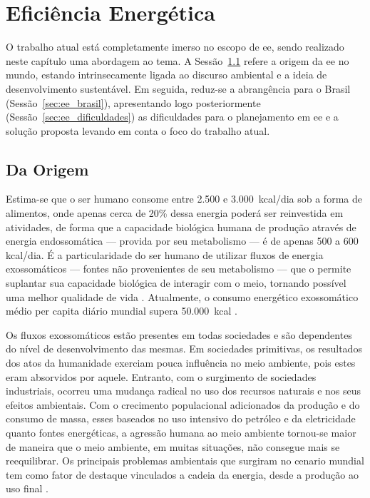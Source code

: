 \chapter{Eficiência Energética}
\label{chap:ee}
\glsresetall

O trabalho atual está completamente imerso no escopo de \gls{ee},
sendo realizado neste capítulo uma abordagem ao tema. 
A Sessão~\ref{sec:ee_origem} refere a origem da \gls{ee} no mundo, estando
intrinsecamente ligada ao discurso ambiental e a ideia de desenvolvimento
sustentável. Em seguida, reduz-se a abrangência para o Brasil
(Sessão~\ref{sec:ee_brasil}), apresentando logo posteriormente
(Sessão~\ref{sec:ee_dificuldades}) as dificuldades para o planejamento em \gls{ee} 
e a solução proposta levando em conta o foco do trabalho atual.

\section{Da Origem}
\label{sec:ee_origem}

Estima-se que o ser humano consome entre 2.500 e 3.000~\acs{kcal}/dia sob a 
forma de alimentos, onde apenas cerca de 20\% dessa energia poderá ser 
reinvestida em atividades, de forma que a capacidade biológica humana de produção
através de energia endossomática --- provida por seu metabolismo --- é de 
apenas 500 a 600 \acs{kcal}/dia. É a particularidade do ser humano de
utilizar fluxos de energia exossomáticos --- fontes não provenientes de seu metabolismo 
--- que o permite suplantar sua capacidade biológica de interagir com o meio,
tornando possível uma melhor qualidade de vida \cite{rippel}. 
Atualmente, o consumo energético exossomático médio per capita diário 
mundial supera 50.000~\acs{kcal} \cite{world_statics_2012}.

Os fluxos exossomáticos estão presentes em todas sociedades e são dependentes do
nível de desenvolvimento das mesmas. Em sociedades primitivas, os resultados dos
atos da humanidade exerciam pouca influência no meio ambiente, pois estes eram
absorvidos por aquele. Entranto, com o surgimento de sociedades industriais,
ocorreu uma mudança radical no uso dos recursos naturais e nos seus efeitos
ambientais. Com o crecimento populacional adicionados da produção e do consumo 
de massa, esses baseados no uso intensivo do petróleo e da eletricidade quanto 
fontes energéticas, a agressão humana ao meio ambiente tornou-se maior de maneira 
que o meio ambiente, em muitas situações, não consegue mais se reequilibrar. 
Os principais problemas ambientais que surgiram no cenario mundial tem 
como fator de destaque vinculados a cadeia da energia, 
desde a produção ao uso final \cite{rippel,jatoba}.

